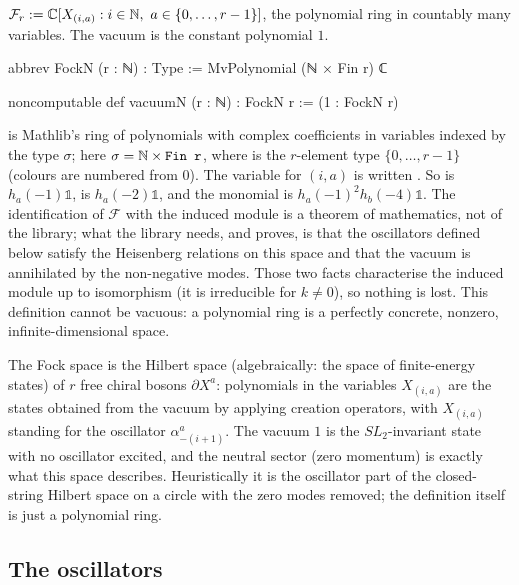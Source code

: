 \begin{definition}\label{ch03:def:FockN}
$\mathcal F_r := \C[X_{(i,a)} : i\in\N,\ a\in\{0,\dots,r-1\}]$, the polynomial ring in countably
many variables. The vacuum is the constant polynomial $1$.
\end{definition}

\begin{leancode}
abbrev FockN (r : ℕ) : Type := MvPolynomial (ℕ × Fin r) ℂ

noncomputable def vacuumN (r : ℕ) : FockN r := (1 : FockN r)
\end{leancode}

\begin{dictionary}
 is Mathlib's ring of polynomials with complex coefficients in variables
indexed by the type $\sigma$; here $\sigma=\N\times\lean{Fin r}$, where  is the
$r$-element type $\{0,\dots,r-1\}$ (colours are numbered from $0$). The variable for $(i,a)$ is
written . So  is $h_a(-1)\mathbb 1$,  is
$h_a(-2)\mathbb 1$, and the monomial  is
$h_a(-1)^2h_b(-4)\mathbb 1$. The identification of $\mathcal F$ with the induced module is a
theorem of mathematics, not of the library; what the library needs, and proves, is that the
oscillators defined below satisfy the Heisenberg relations on this space and that the vacuum is
annihilated by the non-negative modes. Those two facts characterise the induced module up to
isomorphism (it is irreducible for $k\ne 0$), so nothing is lost. This definition cannot be
vacuous: a polynomial ring is a perfectly concrete, nonzero, infinite-dimensional space.
\end{dictionary}

\begin{physics}
The Fock space is the Hilbert space (algebraically: the space of finite-energy states) of $r$ free chiral bosons $\partial X^a$: polynomials in the variables $X_{(i,a)}$ are the states obtained from the vacuum by applying creation operators, with $X_{(i,a)}$ standing for the oscillator $\alpha^a_{-(i+1)}$. The vacuum $1$ is the $SL_2$-invariant state with no oscillator excited, and the neutral sector (zero momentum) is exactly what this space describes. Heuristically it is the oscillator part of the closed-string Hilbert space on a circle with the zero modes removed; the definition itself is just a polynomial ring.
\end{physics}

\subsection{The oscillators}

